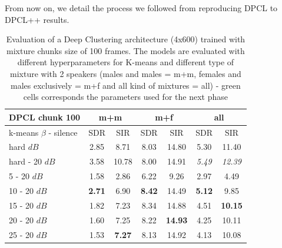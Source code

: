 \documentclass[master, tikz, final,11pt, dvipdfmx]{iscs-thesis}
\begin{document}
From now on, we detail the process we followed from reproducing DPCL \cite{DPCLV1} to DPCL++ \cite{DPCLV2} results.


\begin{table}[h]
\centering
\begin{tabular}{l|c|c|c|c|c|c}
DPCL chunk 100 & \multicolumn{2}{c|}{m+m} & \multicolumn{2}{c|}{m+f} & \multicolumn{2}{c}{all} \\ 
\hline 
k-means $\beta$ - silence & SDR & SIR & SDR & SIR & SDR & SIR \\ 
\hline 
hard $dB$ & 2.85 & 8.71 & 8.03 & 14.80 & 5.30 & 11.40 \\ 
hard - 20 $dB$ & 3.58 & 10.78 & 8.00 & 14.91 & \textit{5.49} & \textit{12.39} \\ 
\hline 
\hline 
5 - 20 $dB$ & 1.58 & 2.86 & 6.22 & 9.26 & 2.97 & 4.49 \\ 
10 - 20 $dB$ &  \cellcolor{green}\textbf{2.71} & \cellcolor{green}6.90 & \cellcolor{green}\textbf{8.42} &\cellcolor{green} 14.49 & \cellcolor{green}\textbf{5.12} & \cellcolor{green}9.85 \\ 
15 - 20 $dB$ & 1.82 & 7.23 & 8.34 & 14.88 & 4.51 & \textbf{10.15} \\ 
20 - 20 $dB$ & 1.60 & 7.25 & 8.22 & \textbf{14.93} & 4.25 & 10.11 \\ 
25 - 20 $dB$ & 1.53 & \textbf{7.27} & 8.13 & 14.92 & 4.13 & 10.08 \\ 
\end{tabular}
\caption[Evaluation of a Deep Clustering trained with chunks size of 100 frames]{Evaluation of a Deep Clustering architecture (4x600) trained with mixture chunks size of 100 frames. The models are evaluated with different hyperparameters for K-means and different type of mixture with 2 speakers (males and males = m+m, females and males exclusively = m+f and all kind of mixtures = all) - green cells corresponds the parameters used for the next phase}
\label{table:DPCLV1}
\end{table}
\end{document}
